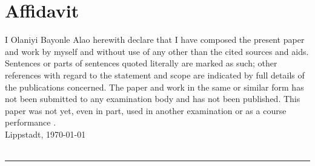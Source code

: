 \tableofcontents			%




\pagestyle{fancy}



% 



\newpage
\lhead{}
\rhead{\leftmark}





\listoffigures				%
\listoftables				%

\chapter*{Affidavit}
I Olaniyi Bayonle Alao herewith declare that I have composed the present paper and work by myself and without use of any other than the cited sources and aids. Sentences or parts of sentences quoted literally are marked as such; other references with regard to the statement and scope are indicated by full details of the publications concerned. The paper and work in the same or similar form has not been submitted to any examination body and has not been published. This paper was not yet, even in part, used in another examination or as a course performance
. ~\\
Lippstadt,  \today\\[.6cm] %
\myauthor\\ %
\rule[0.5em]{20em}{0.5pt}


% 


